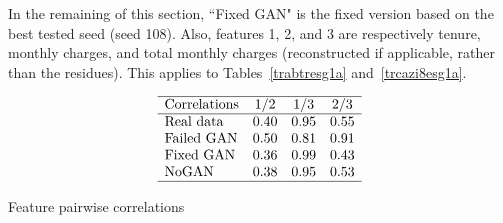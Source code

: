 \documentclass[oneside,10pt]{book}
\renewcommand{\arraystretch}{1.4} %
\begin{document}
\begin{table}[H]
\small
\begin{center}
\caption{\label{ccpufd2po} Quality \texttt{g\_dist} of synthetization, depending on model and epoch number}
\end{center}
\end{table}



In the remaining of this section, ``Fixed GAN" is the fixed version based on the best tested seed (seed 108). Also, features 1, 2, and 3
 are respectively tenure, monthly charges, and total monthly charges (reconstructed if applicable, rather than the residues). This applies to Tables~\ref{trabtresg1a} and~\ref{trcazi8esg1a}.



\begin{table}[H]
\small
\[
\begin{array}{lccc}
\hline
\text{Correlations}	&  1/2 & 1/3 & 2/3\\ 
\hline
 \text{Real data} &  0.40 &  0.95 & 0.55 \\
\text{Failed GAN} &  0.50 &  0.81 & 0.91 \\
\text{Fixed GAN} &  0.36 &  0.99 & 0.43 \\
\text{NoGAN} &  0.38 &  0.95 & 0.53 \\
\hline
\end{array}
\]
\caption{\label{trabtresg1a} Feature pairwise correlations}
\end{table}
\end{document}
